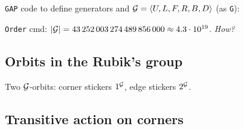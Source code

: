 
\begin{slide}
    \texttt{GAP} code to define generators and $\mathcal{G} = \langle U,L,F,R,B,D \rangle$ (as \texttt{G}):

    {\footnotesize} \pause

    \texttt{Order} cmd: $|\mathcal{G}| = 43\,252\,003\,274\,489\,856\,000 \approx 4.3 \cdot 10^{19}$. \textit{How?}
\end{slide}

\subsection{Orbits in the Rubik's group}

\begin{slide}
    \begin{center}
    \end{center}

    \scriptsize

    \normalsize Two $\mathcal{G}$-orbits: corner stickers $1^{\mathcal{G}}$, edge stickers $2^{\mathcal{G}}$.
\end{slide}

\subsection{Transitive action on corners}

